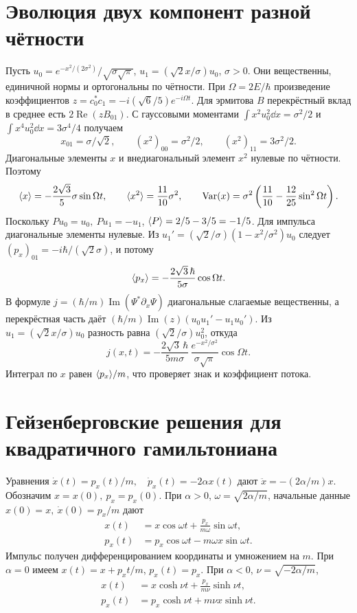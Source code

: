 \documentclass[11pt,a4paper]{article}
\begin{document}
\section{Эволюция двух компонент разной чётности}

Пусть \(u_0=e^{-x^2/(2\sigma^2)}/\sqrt{\sigma\sqrt\pi}\),
\(u_1=(\sqrt2 x/\sigma)u_0\), \(\sigma>0\).
Они вещественны, единичной нормы и ортогональны по чётности.
При \(\Omega=2E/\hbar\) произведение коэффициентов
\(z=c_0^*c_1=-i(\sqrt6/5)e^{-i\Omega t}\). Для эрмитова \(B\)
перекрёстный вклад в среднее есть \(2\operatorname{Re}(z B_{01})\).
С гауссовыми моментами
\(\int x^2 u_0^2\dd x=\sigma^2/2\) и
\(\int x^4 u_0^2\dd x=3\sigma^4/4\) получаем
\[
 x_{01}=\sigma/\sqrt2,\qquad
 (x^2)_{00}=\sigma^2/2,\qquad (x^2)_{11}=3\sigma^2/2 .
\]
Диагональные элементы \(x\) и внедиагональный элемент \(x^2\)
нулевые по чётности. Поэтому
\[
 \langle x\rangle=-\frac{2\sqrt3}{5}\sigma\sin\Omega t,\qquad
 \langle x^2\rangle=\frac{11}{10}\sigma^2,\qquad
 \operatorname{Var}(x)=\sigma^2\left(\frac{11}{10}-\frac{12}{25}\sin^2\Omega t\right).
\]
Поскольку \(Pu_0=u_0,\ Pu_1=-u_1\),
\(\langle P\rangle=2/5-3/5=-1/5\).
Для импульса диагональные элементы нулевые. Из
\(u_1'=(\sqrt2/\sigma)(1-x^2/\sigma^2)u_0\) следует
\((p_x)_{01}=-i\hbar/(\sqrt2\sigma)\), и потому
\[
 \langle p_x\rangle=-\frac{2\sqrt3\,\hbar}{5\sigma}\cos\Omega t.
\]
В формуле \(j=(\hbar/m)\operatorname{Im}(\Psi^*\partial_x\Psi)\)
диагональные слагаемые вещественны, а перекрёстная часть даёт
\((\hbar/m)\operatorname{Im}(z)(u_0 u_1'-u_1u_0')\).
Из \(u_1=(\sqrt2 x/\sigma)u_0\) разность равна
\((\sqrt2/\sigma)u_0^2\), откуда
\[
 j(x,t)=-\frac{2\sqrt3\,\hbar}{5m\sigma}\,
         \frac{e^{-x^2/\sigma^2}}{\sigma\sqrt\pi}\cos\Omega t.
\]
Интеграл по \(x\) равен \(\langle p_x\rangle/m\), что проверяет знак
и коэффициент потока.

\section{Гейзенберговские решения для квадратичного гамильтониана}

Уравнения \(\dot x(t)=p_x(t)/m,\quad \dot p_x(t)=-2\alpha x(t)\)
дают \(\ddot x=-(2\alpha/m)x\).
Обозначим \(x=x(0),\ p_x=p_x(0)\).
При \(\alpha>0\), \(\omega=\sqrt{2\alpha/m}\),
начальные данные \(x(0)=x,\ \dot x(0)=p_x/m\) дают
\begin{align*}
 x(t)&=x\cos\omega t+\frac{p_x}{m\omega}\sin\omega t,\\
 p_x(t)&=p_x\cos\omega t-m\omega x\sin\omega t .
\end{align*}
Импульс получен дифференцированием координаты и умножением на \(m\).
При \(\alpha=0\) имеем \(x(t)=x+p_xt/m\), \(p_x(t)=p_x\).
При \(\alpha<0\), \(\nu=\sqrt{-2\alpha/m}\),
\begin{align*}
 x(t)&=x\cosh\nu t+\frac{p_x}{m\nu}\sinh\nu t,\\
 p_x(t)&=p_x\cosh\nu t+m\nu x\sinh\nu t .
\end{align*}
\end{document}
